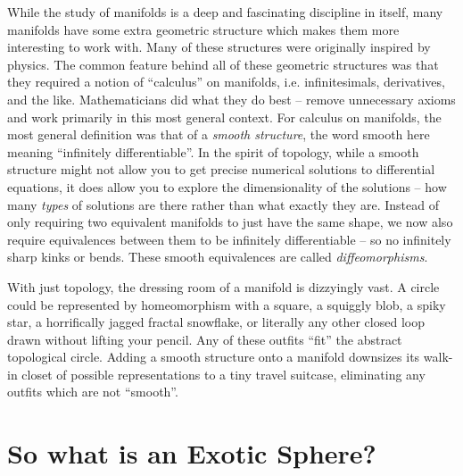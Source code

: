 While the study of manifolds is a deep and fascinating discipline in itself, many manifolds have some extra geometric structure which makes them more interesting to work with. Many of these structures were originally inspired by physics.
The common feature behind all of these geometric structures was that they required a notion of ``calculus'' on manifolds, i.e. infinitesimals, derivatives, and the like. Mathematicians did what they do best -- remove unnecessary axioms and work primarily in this most general context. For calculus on manifolds, the most general definition was that of a \emph{smooth structure}, the word smooth here meaning ``infinitely differentiable''. In the spirit of topology, while a smooth structure might not allow you to get precise numerical solutions to differential equations, it does allow you to explore the dimensionality of the solutions -- how many \emph{types} of solutions are there rather than what exactly they are. Instead of only requiring two equivalent manifolds to just have the same shape, we now also require equivalences between them to be infinitely differentiable -- so no infinitely sharp kinks or bends. These smooth equivalences are called \emph{diffeomorphisms}.

With just topology, the dressing room of a manifold is dizzyingly vast.
A circle could be represented by homeomorphism with a square, a squiggly blob, a spiky star, a horrifically jagged fractal snowflake, or literally any other closed loop drawn without lifting your pencil. Any of these outfits ``fit'' the abstract topological circle.
Adding a smooth structure onto a manifold downsizes its walk-in closet of possible representations to a tiny travel suitcase, eliminating any outfits which are not ``smooth''. 

\section*{So what is an Exotic Sphere?}

